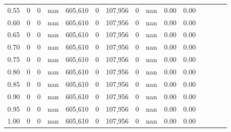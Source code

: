 \begin{tabular}{rrrcrrrrrrrrrrr}
0.55 &        0 &       0 &                                        nan &  605,610 &        0 &  107,956 &        0 &   nan &  0.00 &                         0.00 \\
0.60 &        0 &       0 &                                        nan &  605,610 &        0 &  107,956 &        0 &   nan &  0.00 &                         0.00 \\
0.65 &        0 &       0 &                                        nan &  605,610 &        0 &  107,956 &        0 &   nan &  0.00 &                         0.00 \\
0.70 &        0 &       0 &                                        nan &  605,610 &        0 &  107,956 &        0 &   nan &  0.00 &                         0.00 \\
0.75 &        0 &       0 &                                        nan &  605,610 &        0 &  107,956 &        0 &   nan &  0.00 &                         0.00 \\
0.80 &        0 &       0 &                                        nan &  605,610 &        0 &  107,956 &        0 &   nan &  0.00 &                         0.00 \\
0.85 &        0 &       0 &                                        nan &  605,610 &        0 &  107,956 &        0 &   nan &  0.00 &                         0.00 \\
0.90 &        0 &       0 &                                        nan &  605,610 &        0 &  107,956 &        0 &   nan &  0.00 &                         0.00 \\
0.95 &        0 &       0 &                                        nan &  605,610 &        0 &  107,956 &        0 &   nan &  0.00 &                         0.00 \\
1.00 &        0 &       0 &                                        nan &  605,610 &        0 &  107,956 &        0 &   nan &  0.00 &                         0.00 \\
\bottomrule
\end{tabular}
